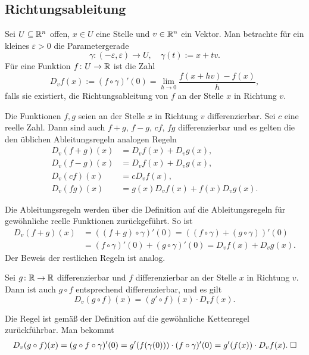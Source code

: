 \subsection{Richtungsableitung}

\begin{Definition}[Richtungsableitung]
Sei $U\subseteq\mathbb R^n$ offen, $x\in U$ eine Stelle und $v\in\mathbb R^n$
ein Vektor. Man betrachte für ein kleines $\varepsilon>0$
die Parametergerade
\[\gamma\colon(-\varepsilon,\varepsilon)\to U,\quad \gamma(t):=x+tv.\]
Für eine Funktion $f\colon U\to\mathbb R$ ist die Zahl
\[D_v f(x) := (f\circ\gamma)'(0) = \lim_{h\to 0}\frac{f(x+hv)-f(x)}{h},\]
falls sie existiert, die Richtungsableitung von $f$ an der Stelle $x$ in
Richtung $v$.
\end{Definition}
\begin{Satz}
Die Funktionen $f,g$ seien an der Stelle $x$ in Richtung $v$
differenzierbar. Sei $c$ eine reelle Zahl. Dann sind auch
$f+g$, $f-g$, $cf$, $fg$ differenzierbar und es gelten die
den üblichen Ableitungsregeln analogen Regeln
\begin{align*}
D_v(f+g)(x) &= D_v f(x)+D_v g(x),\\
D_v(f-g)(x) &= D_v f(x)+D_v g(x),\\
D_v(cf)(x) &= cD_v f(x),\\
D_v(fg)(x) &= g(x)D_v f(x) + f(x)D_v g(x).
\end{align*}
\end{Satz}
\begin{Beweis}
Die Ableitungsregeln werden über die Definition
auf die Ableitungsregeln für gewöhnliche reelle Funktionen
zurückgeführt. So ist
\begin{align*}
D_v(f+g)(x) &= ((f+g)\circ\gamma)'(0)
= ((f\circ\gamma)+(g\circ\gamma))'(0)\\
&= (f\circ\gamma)'(0)+(g\circ\gamma)'(0)
= D_v f(x) + D_v g(x).
\end{align*}
Der Beweis der restlichen Regeln ist analog.\,\qedsymbol
\end{Beweis}

\begin{Satz}[Kettenregel]\newlinefirst
Sei $g\colon\mathbb R\to\mathbb R$ differenzierbar und
$f$ differenzierbar an der Stelle $x$ in Richtung $v$. Dann ist
auch $g\circ f$ entsprechend differenzierbar, und es gilt
\[D_v(g\circ f)(x) = (g'\circ f)(x)\cdot D_v f(x).\]
\end{Satz}
\begin{Beweis}
Die Regel ist gemäß der Definition auf die gewöhnliche Kettenregel
zurückführbar. Man bekommt
\begin{align*}
D_v(g\circ f)(x) = (g\circ f\circ\gamma)'(0)
= g'(f(\gamma(0)))\cdot (f\circ\gamma)'(0)
= g'(f(x))\cdot D_v f(x).\;\square
\end{align*}
\end{Beweis}

